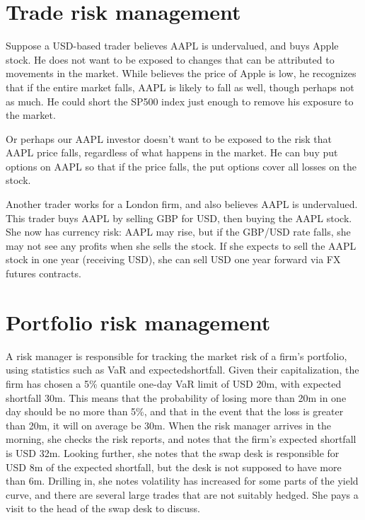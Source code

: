 \documentclass{report}
\numberwithin{problem}{chapter} %
\begin{document}
\section{Trade risk management}

Suppose a USD-based trader believes AAPL is undervalued, and buys Apple stock.  He does not want to be exposed to changes that can be attributed to movements in the market. While believes the price of Apple is low, he recognizes that if the entire market falls, AAPL is likely to fall as well, though perhaps not as much. He could \gls{short} the SP500 index just enough to remove his exposure to the market. 

Or perhaps our AAPL investor doesn't want to be exposed to the risk that AAPL price falls, regardless of what happens in the market. He can buy put options on AAPL so that if the price falls, the put options cover all losses on the stock. 

Another trader works for a London firm, and also believes AAPL is undervalued. This trader buys AAPL by selling GBP for USD, then buying the AAPL stock. She now has currency risk: AAPL may rise, but if the GBP/USD rate falls, she may not see any profits when she sells the stock. If she expects to sell the AAPL stock in one year (receiving USD), she can sell USD one year forward via FX futures contracts. 

\section{Portfolio risk management}

A risk manager is responsible for tracking the \gls{market risk} of a firm's portfolio, using statistics such as \gls{VaR} and \gls{expectedshortfall}. Given their capitalization, the firm has chosen a 5\% quantile one-day VaR limit of USD 20m, with expected shortfall 30m. This means that the probability of losing more than 20m in one day should be no more than 5\%, and that in the event that the loss is greater than 20m, it will on average be 30m. When the risk manager arrives in the morning, she checks the risk reports, and notes that the firm's expected shortfall is USD 32m. Looking further, she notes that the swap desk is responsible for USD 8m of the expected shortfall, but the desk is not supposed to have more than 6m. Drilling in, she notes volatility has increased for some parts of the yield curve, and there are several large trades that are not suitably hedged. She pays a visit to the head of the swap desk to discuss. 
\end{document}
